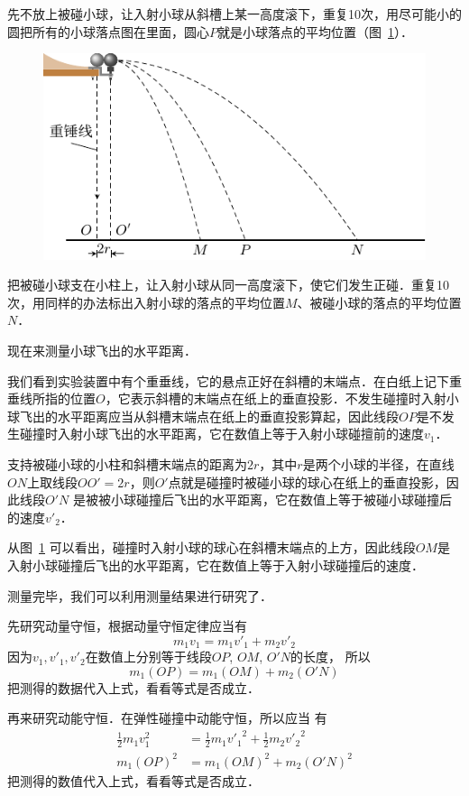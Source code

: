 先不放上被碰小球，让入射小球从斜槽上某一高度滚下，重复10次，用尽可能小的圆把所有的小球落点图在里面，圆心$P$就是小球落点的平均位置（图~\ref{fig_A_10-19}）．
\begin{figure}[htbp]
    \centering
    \includegraphics{fig/A/10-19.pdf}
    \caption{}\label{fig_A_10-19}
\end{figure}

把被碰小球支在小柱上，让入射小球从同一高度滚下，使它们发生正碰．重复10次，用同样的办法标出入射小球的落点的平均位置$M$、被碰小球的落点的平均位置$N$．

现在来测量小球飞出的水平距离．

我们看到实验装置中有个重垂线，它的悬点正好在斜槽的末端点．在白纸上记下重垂线所指的位置$O$，它表示斜槽的末端点在纸上的垂直投影．不发生碰撞时入射小球飞出的水平距离应当从斜槽末端点在纸上的垂直投影算起，因此线段$OP$是不发生碰撞时入射小球飞出的水平距离，它在数值上等于入射小球碰擅前的速度$v_1$．

支持被碰小球的小柱和斜槽末端点的距离为$2r$，其中$r$是两个小球的半径，在直线$ON$上取线段$OO'=2r$，则$O'$点就是碰撞时被碰小球的球心在纸上的垂直投影，因此线段$O'N$ 是被被小球碰撞后飞出的水平距离，它在数值上等于被碰小球碰撞后的速度$v'_2$．

从图~\ref{fig_A_10-19} 可以看出，碰撞时入射小球的球心在斜槽末端点的上方，因此线段$OM$是入射小球碰撞后飞出的水平距离，它在数值上等于入射小球碰撞后的速度．

测量完毕，我们可以利用测量结果进行研究了．

先研究动量守恒，根据动量守恒定律应当有
\[m_1v_1=m_1v'_1+m_2v'_2 \]
因为$v_1, v'_1,v'_2$在数值上分别等于线段$OP$, $OM$, $O'N$的长度，
所以
\[m_1(OP)=m_1(OM)+m_2(O'N)\]
把测得的数据代入上式，看看等式是否成立．

再来研究动能守恒．在弹性碰撞中动能守恒，所以应当
有
\[\begin{split}
    \frac{1}{2}m_1v_1^2&=\frac{1}{2}m_1{v'_1}^2+\frac{1}{2}m_2{v'_2}^2\\
    m_1(OP)^2&=m_1(OM)^2+m_2(O'N)^2
\end{split}\]
把测得的数值代入上式，看看等式是否成立．

